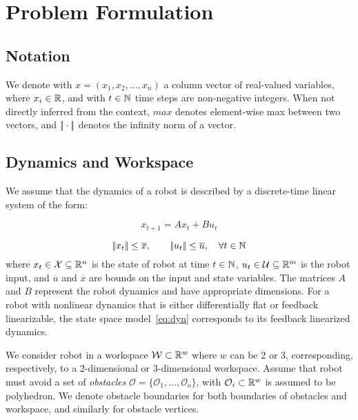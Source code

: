 \section{Problem Formulation}

\subsection{Notation}

We denote with $x = (x_1, x_2, ..., x_n)$ a column vector of real-valued variables, where $x_i \in {\mathbb{R}}$,
and with $t \in {\mathbb{N}}$ time steps are non-negative integers. 
When not directly inferred from the context, $max$ denotes element-wise max between two vectors, 
and $|\!|\cdot|\!|$ denotes the infinity norm of a vector.


\subsection{Dynamics and Workspace}

We assume that the dynamics of a robot is described by a discrete-time linear system of the form:

\begin{equation}
    \label{eq:dyn}    
    x_{t+1} = A x_{t} + B u_{t} 
\end{equation}

\begin{equation}
    \label{eq:ulimit}    
    |\!|x_t|\!| \le \overline{x}, \qquad |\!|u_t|\!| \le \overline{u}, \quad \forall t \in {\mathbb{N}}
\end{equation}
where $x_t \in \mathcal{X} \subseteq {\mathbb{R}}^{n}$ is the state of robot at time $t \in {\mathbb{N}}$, 
$u_t \in \mathcal{U} \subseteq {\mathbb{R}}^{m}$ is the robot input,
and $\overline{u}$ and $\overline{x}$ are bounds on the input and state variables. 
The matrices $A$ and $B$ represent the robot dynamics and have appropriate dimensions. 
For a robot with nonlinear dynamics that is either differentially flat or feedback linearizable, 
the state space model~\eqref{eq:dyn} corresponds to its feedback linearized dynamics.

We consider robot in a workspace ${\mathcal{W}} \subset {\mathbb{R}}^{w}$ where $w$ can be $2$ or $3$, 
corresponding,  respectively, to a $2$-dimensional or $3$-dimensional workspace. 
Assume that robot must avoid a set of \emph{obstacles} $\mathcal{O} = \{\mathcal{O}_1, \ldots, \mathcal{O}_o\}$, 
with $\mathcal{O}_i \subset {\mathbb{R}}^w$ is assumed to be polyhedron.
We denote obstacle boundaries for both boundaries of obstacles and workspace, and similarly for obstacle vertices. 



